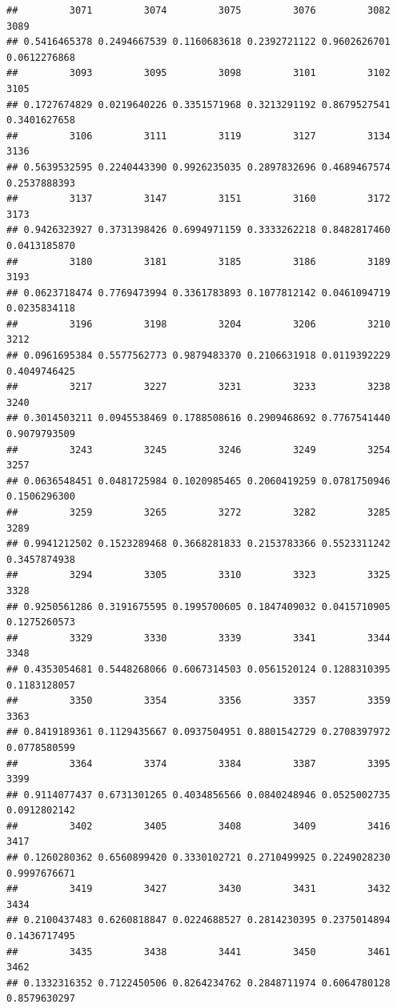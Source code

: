 \documentclass[
]{article}
\begin{document}
\begin{verbatim}
##         3071         3074         3075         3076         3082         3089 
## 0.5416465378 0.2494667539 0.1160683618 0.2392721122 0.9602626701 0.0612276868 
##         3093         3095         3098         3101         3102         3105 
## 0.1727674829 0.0219640226 0.3351571968 0.3213291192 0.8679527541 0.3401627658 
##         3106         3111         3119         3127         3134         3136 
## 0.5639532595 0.2240443390 0.9926235035 0.2897832696 0.4689467574 0.2537888393 
##         3137         3147         3151         3160         3172         3173 
## 0.9426323927 0.3731398426 0.6994971159 0.3333262218 0.8482817460 0.0413185870 
##         3180         3181         3185         3186         3189         3193 
## 0.0623718474 0.7769473994 0.3361783893 0.1077812142 0.0461094719 0.0235834118 
##         3196         3198         3204         3206         3210         3212 
## 0.0961695384 0.5577562773 0.9879483370 0.2106631918 0.0119392229 0.4049746425 
##         3217         3227         3231         3233         3238         3240 
## 0.3014503211 0.0945538469 0.1788508616 0.2909468692 0.7767541440 0.9079793509 
##         3243         3245         3246         3249         3254         3257 
## 0.0636548451 0.0481725984 0.1020985465 0.2060419259 0.0781750946 0.1506296300 
##         3259         3265         3272         3282         3285         3289 
## 0.9941212502 0.1523289468 0.3668281833 0.2153783366 0.5523311242 0.3457874938 
##         3294         3305         3310         3323         3325         3328 
## 0.9250561286 0.3191675595 0.1995700605 0.1847409032 0.0415710905 0.1275260573 
##         3329         3330         3339         3341         3344         3348 
## 0.4353054681 0.5448268066 0.6067314503 0.0561520124 0.1288310395 0.1183128057 
##         3350         3354         3356         3357         3359         3363 
## 0.8419189361 0.1129435667 0.0937504951 0.8801542729 0.2708397972 0.0778580599 
##         3364         3374         3384         3387         3395         3399 
## 0.9114077437 0.6731301265 0.4034856566 0.0840248946 0.0525002735 0.0912802142 
##         3402         3405         3408         3409         3416         3417 
## 0.1260280362 0.6560899420 0.3330102721 0.2710499925 0.2249028230 0.9997676671 
##         3419         3427         3430         3431         3432         3434 
## 0.2100437483 0.6260818847 0.0224688527 0.2814230395 0.2375014894 0.1436717495 
##         3435         3438         3441         3450         3461         3462 
## 0.1332316352 0.7122450506 0.8264234762 0.2848711974 0.6064780128 0.8579630297 

\end{verbatim}
\end{document}
